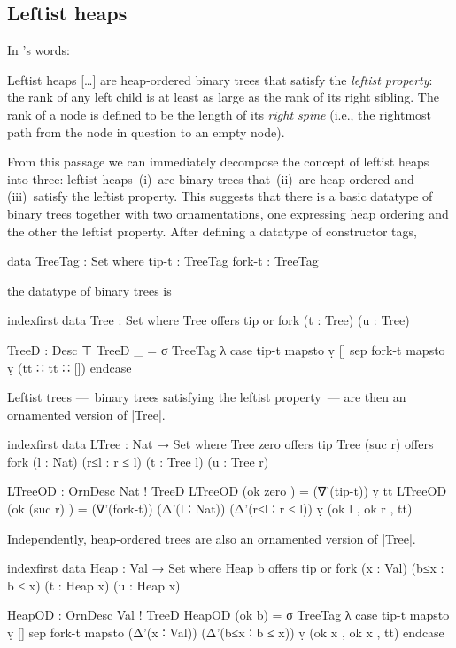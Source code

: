 \subsection{Leftist heaps}


In \citeauthor{Okasaki-data-structures}'s words:
\begin{quoting}\relax
Leftist heaps [\ldots$\!$] are heap-ordered binary trees that satisfy the \emph{leftist property}: the rank of any left child is at least as large as the rank of its right sibling. The rank of a node is defined to be the length of its \emph{right spine} (i.e., the rightmost path from the node in question to an empty node).
\end{quoting}
From this passage we can immediately decompose the concept of leftist heaps into three: leftist heaps \,(i)~are binary trees that \,(ii)~are heap-ordered and \,(iii)~satisfy the leftist property.
This suggests that there is a basic datatype of binary trees together with two ornamentations, one expressing heap ordering and the other the leftist property.
After defining a datatype of constructor tags,
\begin{code}
data TreeTag : Set where
  tip-t   :  TreeTag
  fork-t  :  TreeTag
\end{code}
the datatype of binary trees is
\begin{code}
indexfirst data Tree : Set where
  Tree  offers  tip
        or      fork (t : Tree) (u : Tree)

TreeD : Desc ⊤
TreeD  _ = σ TreeTag λ  case  tip-t   mapsto  ṿ []
                        sep   fork-t  mapsto  ṿ (tt ∷ tt ∷ []) endcase
\end{code}
Leftist trees ---~binary trees satisfying the leftist property~--- are then an ornamented version of |Tree|.
\begin{code}
indexfirst data LTree : Nat → Set where
  Tree zero     offers  tip
  Tree (suc r)  offers  fork (l : Nat) (r≤l : r ≤ l) (t : Tree l) (u : Tree r)

LTreeOD : OrnDesc Nat ! TreeD
LTreeOD (ok zero     )   =  (∇'(tip-t)) ṿ tt
LTreeOD (ok (suc r)  )   =  (∇'(fork-t)) (Δ'(l ∶ Nat)) (Δ'(r≤l ∶ r ≤ l)) ṿ (ok l , ok r , tt)
\end{code}
Independently, heap-ordered trees are also an ornamented version of |Tree|.
\begin{code}
indexfirst data Heap : Val → Set where
  Heap b  offers  tip
          or      fork (x : Val) (b≤x : b ≤ x) (t : Heap x) (u : Heap x)

HeapOD : OrnDesc Val ! TreeD
HeapOD (ok b) =
  σ TreeTag  λ  case  tip-t   mapsto  ṿ []
                sep   fork-t  mapsto  (Δ'(x ∶ Val)) (Δ'(b≤x ∶ b ≤ x)) ṿ (ok x , ok x , tt) endcase
\end{code}
